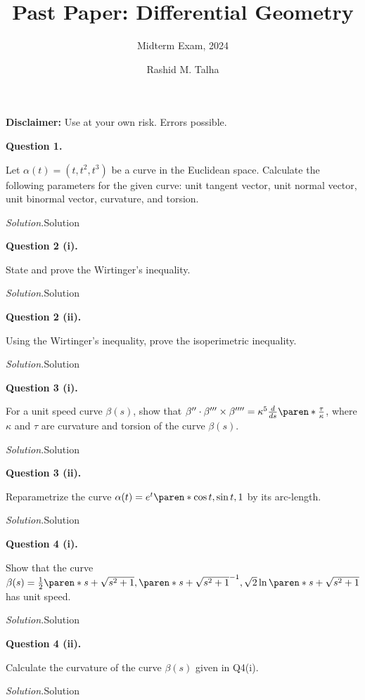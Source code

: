 \documentclass[11pt]{penrose}
\title{Past Paper: Differential Geometry}
\subtitle{Midterm Exam, 2024}
\author{Rashid M. Talha}
\begin{document}
\newenvironment{problem}[2][Question]{\textbf{#1 #2.}\par}{}
\newcommand{\solution}{\textit{Solution.}\hspace{2mm}}

\maketitle

\textbf{Disclaimer:} Use at your own risk. Errors possible.

\begin{problem}{1}
    Let $\alpha(t) = (t, t^2, t^3)$ be a curve in the Euclidean space. Calculate the following parameters for the given curve: unit tangent vector, unit normal vector, unit binormal vector, curvature, and torsion.

    \solution Solution
\end{problem}

\begin{problem}{2 (i)}
    State and prove the Wirtinger's inequality.

    \solution Solution
\end{problem}

\begin{problem}{2 (ii)}
    Using the Wirtinger's inequality, prove the isoperimetric inequality.

    \solution Solution
\end{problem}

\begin{problem}{3 (i)}
    For a unit speed curve $\beta(s)$, show that $\beta'' \cdot \beta''' \times \beta'''' = \kappa^5 \frac{d}{ds}\paren*{\frac{\tau}{\kappa}}$, where $\kappa$ and $\tau$ are curvature and torsion of the curve $\beta(s)$.

    \solution Solution
\end{problem}

\begin{problem}{3 (ii)}
    Reparametrize the curve $\alpha(t) = e^{t}\paren*{\cos t, \sin t, 1}$ by its arc-length.

    \solution Solution
\end{problem}

\begin{problem}{4 (i)}
    Show that the curve $\beta(s) = \frac{1}{2}\paren*{s + \sqrt{s^2 + 1}, \paren*{s + \sqrt{s^2 + 1}}^{-1}, \sqrt{2}\ln\paren*{s + \sqrt{s^2 + 1}}}$ has unit speed.

    \solution Solution
\end{problem}

\begin{problem}{4 (ii)}
    Calculate the curvature of the curve $\beta(s)$ given in Q4(i).

    \solution Solution
\end{problem}
\end{document}
